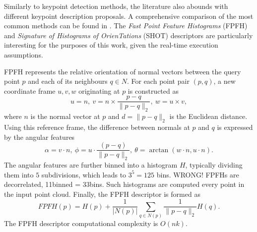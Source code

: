 

Similarly to keypoint detection methods, the literature also abounds with different keypoint description proposals. A comprehensive comparison of the most common methods can be found in \cite{descriptorsComparison}. The \textit{Fast Point Feature Histograms} (FPFH) \cite{FPFH, FPFH2} and \textit{Signature of Histograms of OrienTations} (SHOT) \cite{SHOT} descriptors are particularly interesting for the purposes of this work, given the real-time execution assumptions.


FPFH represents the relative orientation of normal vectors between the query point $p$ and each of its neighbours $q \in N$. For each point pair $(p, q)$, a new coordinate frame $u,v,w$ originating at $p$ is constructed as
\begin{equation}
u = n,\  v = n \times \frac{p-q}{\|p-q\|_2},\  w = u \times v,
\end{equation}
where $n$ is the normal vector at $p$ and $d = \|p-q\|_2$ is the Euclidean distance. Using this reference frame, the difference between normals at $p$ and $q$ is expressed by the angular features
\begin{equation}
\alpha = v \cdot n, \  \phi = u \cdot \frac{(p-q)}{\|p-q\|_2}, \ \theta = \arctan(w\cdot n, u \cdot n).
\label{eq:fpfhangulars}
\end{equation}
The angular features are further binned into a histogram $H$, typically dividing them into $5$ subdivisions, which leads to $3^5=125$ bins. WRONG! FPFHs are decorrelated, 11binned = 33bins. Such histograms are computed every point in the input point cloud. Finally, the FPFH descriptor is formed as
\begin{equation}
FPFH(p) = H(p) + \frac{1}{|N(p)|}\sum\limits_{q\in N(p)}\frac{1}{ \|p-q\|_2}H(q).
\end{equation}
The FPFH descriptor computational complexity is $O(nk)$.


